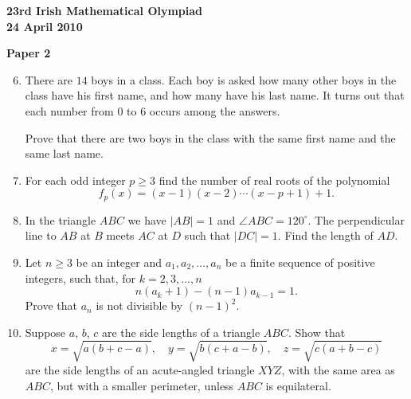 \documentclass[12pt]{article}
\begin{document}
\newpage
\begin{center}
{\large\bfseries 23rd Irish Mathematical Olympiad\\24 April 2010}
\end{center}
\bigskip\noindent\textbf{Paper 2}\bigskip
\begin{enumerate}
\setcounter{enumi}{5}
\item There are $14$ boys in a class. Each boy is asked how many other boys in the class have his first name, and how many have his last name. It turns out that each number from $0$ to $6$ occurs among the answers.

Prove that there are two boys in the class with the same first name and the same last name.

\item For each odd integer $p \ge 3$ find the number of real roots of the polynomial
\[
f_p(x) = (x-1)(x-2)\cdots(x-p+1) + 1.
\]

\item In the triangle $ABC$ we have $|AB| = 1$ and $\angle ABC = 120^\circ$. The perpendicular line to $AB$ at $B$ meets $AC$ at $D$ such that $|DC| = 1$. Find the length of $AD$.

\item Let $n \ge 3$ be an integer and $a_1, a_2, \ldots, a_n$ be a finite sequence of positive integers, such that, for $k = 2, 3, \ldots, n$
\[
n(a_k + 1) - (n-1)a_{k-1} = 1.
\]
Prove that $a_n$ is not divisible by $(n-1)^2$.

\item Suppose $a$, $b$, $c$ are the side lengths of a triangle $ABC$. Show that
\[
x = \sqrt{a(b+c-a)}, \quad y = \sqrt{b(c+a-b)}, \quad z = \sqrt{c(a+b-c)}
\]
are the side lengths of an acute-angled triangle $XYZ$, with the same area as $ABC$, but with a smaller perimeter, unless $ABC$ is equilateral.
\end{enumerate}
\end{document}
